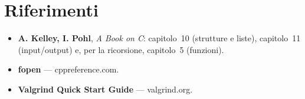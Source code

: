 \section{Riferimenti}

\begin{itemize}
  \item \textbf{A. Kelley, I. Pohl}, \textit{A Book on C}: capitolo~10
        (strutture e liste), capitolo~11 (input/output) e, per la
        ricorsione, capitolo~5 (funzioni).
  \item \textbf{fopen} --- cppreference.com. \\
  \item \textbf{Valgrind Quick Start Guide} --- valgrind.org. \\
\end{itemize}
